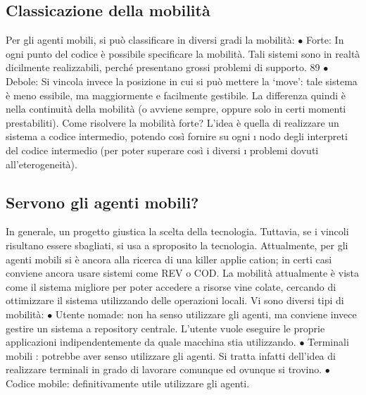 \subsection{Classicazione della mobilità}
Per gli agenti mobili, si può classificare in diversi gradi la mobilità:
$\bullet$ Forte: In ogni punto del codice è possibile specificare la mobilità. Tali
sistemi sono in realtà dicilmente realizzabili, perché presentano grossi
problemi di supporto.
89
$\bullet$ Debole: Si vincola invece la posizione in cui si può mettere la {`}move': tale
sistema è meno essibile, ma maggiormente e facilmente gestibile.
La differenza quindi è nella continuità della mobilità (o avviene sempre, oppure
solo in certi momenti prestabiliti). Come risolvere la mobilità forte? L'idea è
quella di realizzare un sistema a codice intermedio, potendo così fornire su ogni
\i{}
nodo degli interpreti del codice intermedio (per poter superare così i diversi
\i{}
problemi dovuti all'eterogeneità).
\subsection{Servono gli agenti mobili?}
In generale, un progetto giustica la scelta della tecnologia. Tuttavia, se i vincoli
risultano essere sbagliati, si usa a sproposito la tecnologia.
Attualmente, per gli agenti mobili si è ancora alla ricerca di una killer applie
cation; in certi casi conviene ancora usare sistemi come REV o COD. La mobilità
attualmente è vista come il sistema migliore per poter accedere a risorse vine
colate, cercando di ottimizzare il sistema utilizzando delle operazioni locali. Vi
sono diversi tipi di mobilità:
$\bullet$ Utente nomade: non ha senso utilizzare gli agenti, ma conviene invece
gestire un sistema a repository centrale. L'utente vuole eseguire le proprie
applicazioni indipendentemente da quale macchina stia utilizzando.
$\bullet$ Terminali mobili : potrebbe aver senso utilizzare gli agenti. Si tratta infatti
dell'idea di realizzare terminali in grado di lavorare comunque ed ovunque
si trovino.
$\bullet$ Codice mobile: definitivamente utile utilizzare gli agenti.
